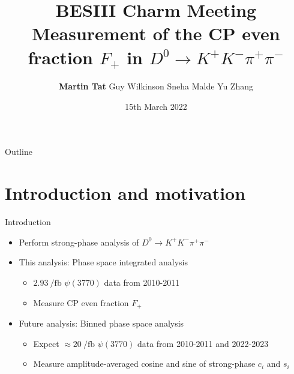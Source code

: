 \documentclass{beamer}
\title[University of Oxford]{BESIII Charm Meeting \\Measurement of the CP even fraction $F_+$ in $D^0\to K^+K^-\pi^+\pi^-$}
\author[Martin Tat]{\textbf{Martin Tat} \hspace{0.54em} Guy Wilkinson \hspace{0.54em} Sneha Malde \hspace{0.54em} Yu Zhang}
\institute{University of Oxford}
\date{15th March 2022}
\begin{document}
\begin{frame}
  \titlepage
\end{frame}

\begin{frame}{Outline}
  \tableofcontents
\end{frame}

\section{Introduction and motivation}

\begin{frame}{Introduction}
  \begin{itemize}
    \setlength\itemsep{1.5em}
    \item{Perform strong-phase analysis of $D^0\to K^+K^-\pi^+\pi^-$}
    \item{This analysis: Phase space integrated analysis}
    \begin{itemize}
      \item{$\SI{2.93}{\per\femto\barn}$ $\psi(3770)$ data from 2010-2011}
      \item{Measure CP even fraction $F_+$}
    \end{itemize}
    \item{Future analysis: Binned phase space analysis}
    \begin{itemize}
      \item{Expect $\approx\SI{20}{\per\femto\barn}$ $\psi(3770)$ data from 2010-2011 and 2022-2023}
      \item{Measure amplitude-averaged cosine and sine of strong-phase $c_i$ and $s_i$}
    \end{itemize}
  \end{itemize}
\end{frame}
\end{document}
